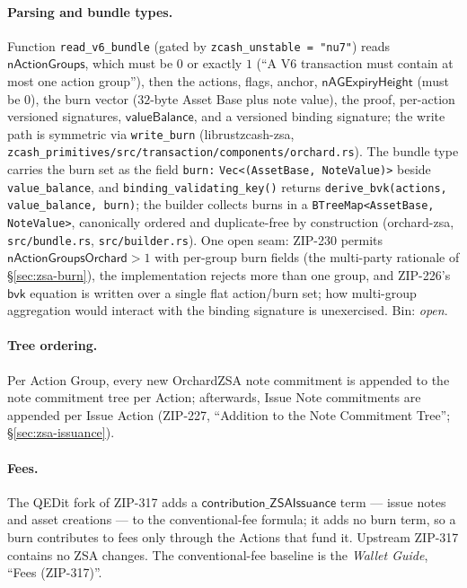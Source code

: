 \documentclass[11pt,a4paper]{article}
\theoremstyle{definition}
\begin{document}
\paragraph{Parsing and bundle types.} Function \texttt{read\_v6\_bundle}
(gated by \texttt{zcash\_unstable = "nu7"}) reads
$\mathsf{nActionGroups}$, which must be $0$ or exactly $1$ (``A V6
transaction must contain at most one action group''), then the actions,
flags, anchor, $\mathsf{nAGExpiryHeight}$ (must be $0$), the burn vector
($32$-byte Asset Base plus note value), the proof, per-action versioned
signatures, $\mathsf{valueBalance}$, and a versioned binding signature; the
write path is symmetric via \texttt{write\_burn}
(\textsf{librustzcash-zsa},
\texttt{zcash\_primitives/src/transaction/components/orchard.rs}). The
bundle type carries the burn set as the field \texttt{burn:}
\texttt{Vec<(AssetBase, NoteValue)>} beside \texttt{value\_balance}, and
\texttt{binding\_validating\_key()} returns \texttt{derive\_bvk(actions,}
\texttt{value\_balance, burn)}; the builder collects burns in a
\texttt{BTreeMap<AssetBase, NoteValue>}, canonically ordered and
duplicate-free by construction (\textsf{orchard-zsa},
\texttt{src/bundle.rs}, \texttt{src/builder.rs}). One open seam: ZIP-230
permits $\mathsf{nActionGroupsOrchard} > 1$ with per-group burn fields (the
multi-party rationale of \S\ref{sec:zsa-burn}), the implementation rejects
more than one group, and ZIP-226's $\mathsf{bvk}$ equation is written over
a single flat action/burn set; how multi-group aggregation would interact
with the binding signature is unexercised. Bin: \emph{open}.

\paragraph{Tree ordering.} Per Action Group, every new OrchardZSA note
commitment is appended to the note commitment tree per Action; afterwards,
Issue Note commitments are appended per Issue Action (ZIP-227, ``Addition
to the Note Commitment Tree''; \S\ref{sec:zsa-issuance}).

\paragraph{Fees.} The QEDit fork of ZIP-317 adds a
$\mathsf{contribution\_ZSAIssuance}$ term --- issue notes and asset
creations --- to the conventional-fee formula; it adds no burn term, so a
burn contributes to fees only through the Actions that fund it. Upstream
ZIP-317 contains no ZSA changes. The conventional-fee baseline is the
\emph{Wallet Guide}, ``Fees (ZIP-317)''.
\end{document}
